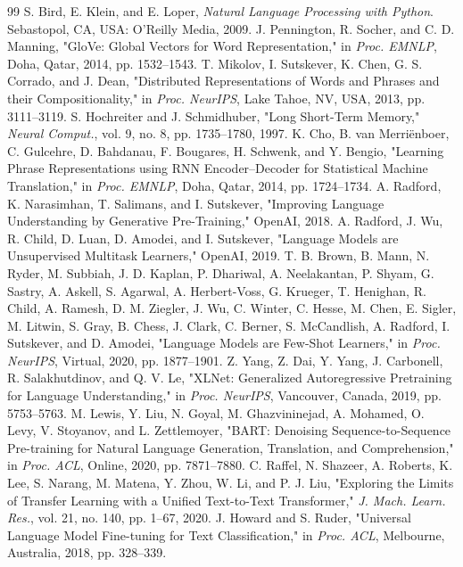 \documentclass[conference]{IEEEtran}
\begin{document}
\begin{thebibliography}{99}
S. Bird, E. Klein, and E. Loper, \textit{Natural Language Processing with Python}. Sebastopol, CA, USA: O'Reilly Media, 2009.
J. Pennington, R. Socher, and C. D. Manning, "GloVe: Global Vectors for Word Representation," in \textit{Proc. EMNLP}, Doha, Qatar, 2014, pp. 1532–1543.
T. Mikolov, I. Sutskever, K. Chen, G. S. Corrado, and J. Dean, "Distributed Representations of Words and Phrases and their Compositionality," in \textit{Proc. NeurIPS}, Lake Tahoe, NV, USA, 2013, pp. 3111–3119.
S. Hochreiter and J. Schmidhuber, "Long Short-Term Memory," \textit{Neural Comput.}, vol. 9, no. 8, pp. 1735–1780, 1997.
K. Cho, B. van Merriënboer, C. Gulcehre, D. Bahdanau, F. Bougares, H. Schwenk, and Y. Bengio, "Learning Phrase Representations using RNN Encoder–Decoder for Statistical Machine Translation," in \textit{Proc. EMNLP}, Doha, Qatar, 2014, pp. 1724–1734.
A. Radford, K. Narasimhan, T. Salimans, and I. Sutskever, "Improving Language Understanding by Generative Pre-Training," OpenAI, 2018.
A. Radford, J. Wu, R. Child, D. Luan, D. Amodei, and I. Sutskever, "Language Models are Unsupervised Multitask Learners," OpenAI, 2019.
T. B. Brown, B. Mann, N. Ryder, M. Subbiah, J. D. Kaplan, P. Dhariwal, A. Neelakantan, P. Shyam, G. Sastry, A. Askell, S. Agarwal, A. Herbert-Voss, G. Krueger, T. Henighan, R. Child, A. Ramesh, D. M. Ziegler, J. Wu, C. Winter, C. Hesse, M. Chen, E. Sigler, M. Litwin, S. Gray, B. Chess, J. Clark, C. Berner, S. McCandlish, A. Radford, I. Sutskever, and D. Amodei, "Language Models are Few-Shot Learners," in \textit{Proc. NeurIPS}, Virtual, 2020, pp. 1877–1901.
Z. Yang, Z. Dai, Y. Yang, J. Carbonell, R. Salakhutdinov, and Q. V. Le, "XLNet: Generalized Autoregressive Pretraining for Language Understanding," in \textit{Proc. NeurIPS}, Vancouver, Canada, 2019, pp. 5753–5763.
M. Lewis, Y. Liu, N. Goyal, M. Ghazvininejad, A. Mohamed, O. Levy, V. Stoyanov, and L. Zettlemoyer, "BART: Denoising Sequence-to-Sequence Pre-training for Natural Language Generation, Translation, and Comprehension," in \textit{Proc. ACL}, Online, 2020, pp. 7871–7880.
C. Raffel, N. Shazeer, A. Roberts, K. Lee, S. Narang, M. Matena, Y. Zhou, W. Li, and P. J. Liu, "Exploring the Limits of Transfer Learning with a Unified Text-to-Text Transformer," \textit{J. Mach. Learn. Res.}, vol. 21, no. 140, pp. 1–67, 2020.
J. Howard and S. Ruder, "Universal Language Model Fine-tuning for Text Classification," in \textit{Proc. ACL}, Melbourne, Australia, 2018, pp. 328–339.

\end{thebibliography}
\end{document}
